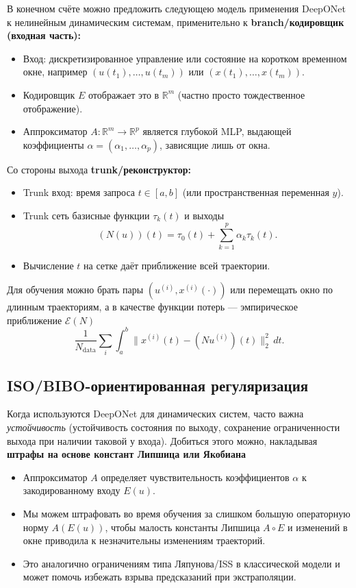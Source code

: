 \documentclass[../NDCNNAI_main.tex]{subfiles}
\begin{document}
В конечном счёте можно предложить следующею модель применения DeepONet к нелинейным динамическим системам, применительно к \textbf{branch/кодировщик (входная часть):}
\begin{itemize}
    \item Вход: дискретизированное управление или состояние на коротком временном окне, например $(u(t_1), \dots, u(t_m))$ или $(x(t_1), \dots, x(t_m))$.
    \item Кодировщик $E$ отображает это в $\mathbb{R}^m$ (частно просто тождественное отображение).
    \item Аппроксиматор $A\colon \mathbb{R}^m \to \mathbb{R}^p$ является глубокой MLP, выдающей коэффициенты $\alpha = (\alpha_1, \dots, \alpha_p)$, зависящие лишь от окна.
\end{itemize}
Со стороны выхода \textbf{trunk/реконструктор:}
\begin{itemize}
    \item Trunk вход: время запроса $t \in [a, b]$ (или пространственная переменная $y$).
    \item Trunk сеть базисные функции $\tau_k(t)$ и выходы
    $$(N(u))(t) = \tau_0(t) + \sum_{k = 1}^{p}\alpha_k\tau_k(t).$$
    \item Вычисление $t$ на сетке даёт приближение всей траектории.
\end{itemize}
Для обучения можно брать пары $(u^{(i)}, x^{(i)}(\cdot))$ или перемещать окно по длинным траекториям, а в качестве функции потерь --- эмпирическое приближение $\mathcal{E}(N)$
$$
\frac{1}{N_{\mathrm{data}}}\sum_{i}\int_{a}^{b}\|x^{(i)}(t) - (Nu^{(i)})(t)\|_2^2\, dt.
$$
\subsection{ISO/BIBO-ориентированная регуляризация}
Когда используются DeepONet для динамических систем, часто важна \emph{устойчивость} (устойчивость состояния по выходу, сохранение ограниченности выхода при наличии таковой у входа).
Добиться этого можно, накладывая \textbf{штрафы на основе констант Липшица или Якобиана}
\begin{itemize}
    \item Аппроксиматор $A$ определяет чувствительность коэффициентов $\alpha$ к закодированному входу $E(u)$.
    \item Мы можем штрафовать во время обучения за слишком большую операторную норму $A(E(u))$, чтобы малость константы Липшица $A \circ E$ и изменений в окне приводила к незначительны изменениям траекторий.
    \item Это аналогично ограничениям типа Ляпунова/ISS в классической модели и может помочь избежать взрыва предсказаний при экстраполяции.
\end{itemize}
\end{document}
